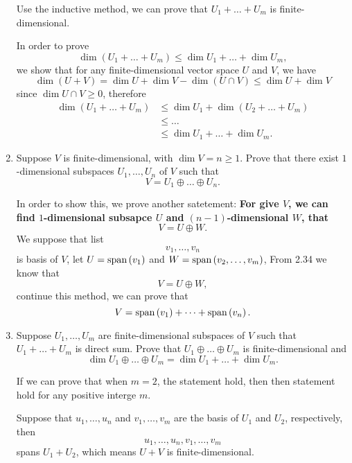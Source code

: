 \begin{enumerate}
\begin{solution}
            Use the inductive method, we can prove that $U_1 + \dots + U_m$ is finite-dimensional.

            In order to prove 
            \[ \dim{(U_1 + \dots + U_m)} \leq \dim{U_1} + \dots + \dim{U_m},\]
            we show that for any finite-dimensional vector space $U$ and $V$, we have 
            \[ \dim{(U+V)} = \dim{U} + \dim{V} - \dim{(U \cap V)} \leq \dim{U} + \dim{V}\]
            since $\dim{U \cap V} \geq 0$, therefore 
            \begin{align*}
                \dim{(U_1 + \dots + U_m)} &\leq \dim{U_1} + \dim{(U_2 + \dots + U_m)} \\
                                          &\leq \dots \\
                                          &\leq \dim{U_1} + \dots + \dim{U_m}.
            \end{align*}
        \end{solution}
    \item Suppose $V$ is finite-dimensional, with $\dim{V} = n \geq 1$. Prove that there exist $1$-dimensional subspaces $U_1, \ldots, U_n$ of 
        $V$ such that 
        \[ V = U_1 \oplus \dots \oplus U_n. \]
        \begin{solution}
            In order to show this, we prove another satetement: \textbf{For give $V$, we can find $1$-dimensional subsapce $U$ and $(n-1)$-dimensional $W$, that}
            \[ V = U \oplus W.\]
            We suppose that list 
            \[ v_1, \ldots, v_n\]
            is basis of $V$, let $U = \text{span}\left(v_1\right)$ and $W = \text{span}\left(v_2, \ldots,v_m\right)$, From 2.34 we know that 
            \[ V = U \oplus W,\]
            continue this method, we can prove that 
            \[ V = \text{span}\left(v_1\right) + \dots + \text{span}\left(v_n\right) .\]
        \end{solution}
    \item Suppose $U_1, \ldots, U_m$ are finite-dimensional subspaces of $V$ such that $U_1 + \dots + U_m$ is direct sum. 
        Prove that $U_1 \oplus \dots \oplus U_m$ is finite-dimensional and 
        \[ \dim{U_1 \oplus \dots \oplus U_m} = \dim{U_1} + \dots + \dim{U_m}. \]
        \begin{solution}
            If we can prove that when $m = 2$, the statement hold, then then statement hold for any positive interge $m$.

            Suppose that $u_1,\ldots,u_n$ and $v_1,\ldots, v_m$ are the basis of $U_1$ and $U_2$, respectively, then 
            \[ u_1, \ldots, u_n, v_1, \ldots, v_m\]
            spans $U_1 + U_2$, which means $U+V$ is finite-dimensional.
            

\end{solution}
\end{enumerate}
